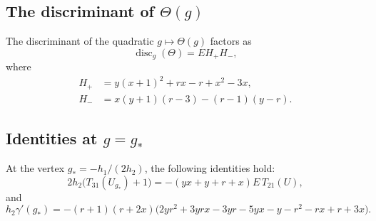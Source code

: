 \documentclass[11pt,onecolumn]{amsart}
\theoremstyle{plain}
\theoremstyle{definition}
\theoremstyle{remark}
\newcommand{\disc}{\operatorname{disc}}
\begin{document}
\subsection*{The discriminant of $\Theta(g)$}
The discriminant of the quadratic $g\mapsto \Theta(g)$ factors as
\[
\disc_g(\Theta)=EH_+H_-,
\]
where
\begin{align*}
H_+ &=y(x+1)^2+rx-r+x^2-3x,\\
H_- &=x(y+1)(r-3)-(r-1)(y-r).
\end{align*}


\subsection*{Identities at $g=g_*$}
At the vertex $g_*=-h_1/(2h_2)$, the following identities hold:
\[
2h_2\bigl(T_{31}(U_{g_*})+1\bigr)
=-(yx+y+r+x)E\,T_{21}(U),
\]
and
\[
h_2\gamma'(g_*)
=-(r+1)(r+2x)
\bigl(2yr^2+3yrx-3yr-5yx-y-r^2-rx+r+3x\bigr).
\]
\end{document}
